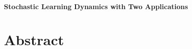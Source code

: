 \documentclass{article}
\begin{document}
\begin{center}
\Large

\end{center}


\vspace{0pt}

\begin{center}
{\bf \LARGE{Stochastic Learning Dynamics with Two Applications}}
\end{center}


\section{Abstract}
\end{document}
